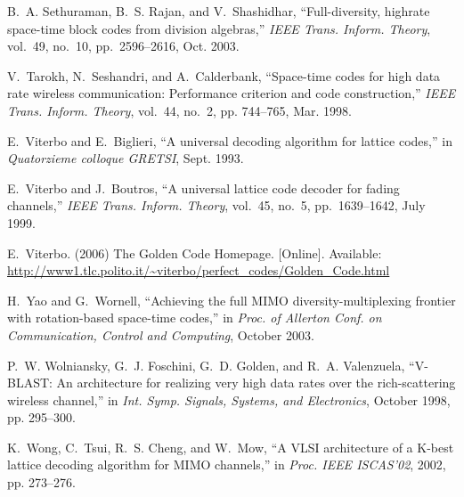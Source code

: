 \documentclass[12pt,onecolumn,draftclsnofoot]{IEEEtran}
\begin{document}
\begin{thebibliography}{10}
B.~A. Sethuraman, B.~S. Rajan, and V.~Shashidhar, ``Full-diversity,
highrate space-time block codes from division algebras,''
\emph{{IEEE} Trans. Inform. Theory}, vol.~49, no.~10,
pp.~2596--2616, Oct. 2003.

V.~Tarokh, N.~Seshandri, and A.~Calderbank, ``Space-time codes for
high data  rate wireless communication: Performance criterion and
code construction,''   \emph{{IEEE} Trans. Inform. Theory}, vol.~44,
no.~2, pp. 744--765, Mar. 1998.

E.~Viterbo and E.~Biglieri, ``A universal decoding algorithm for
lattice codes,'' in \emph{Quatorzieme colloque GRETSI}, Sept. 1993.

E.~Viterbo and J.~Boutros, ``A universal lattice code decoder for
fading channels,'' \emph{{IEEE} Trans. Inform. Theory}, vol.~45,
no.~5, pp.~1639--1642, July 1999.

E.~Viterbo. (2006) The Golden Code Homepage. [Online]. Available:\\
  \url{http://www1.tlc.polito.it/~viterbo/perfect_codes/Golden_Code.html}

H.~Yao and G.~Wornell, ``Achieving the full {MIMO}
diversity-multiplexing frontier with rotation-based space-time
codes,'' in \emph{Proc. of Allerton   Conf. on Communication,
Control and Computing}, October 2003.

P.~W. Wolniansky, G.~J. Foschini, G.~D. Golden, and R.~A.
Valenzuela,  ``{V-BLAST}: An architecture for realizing very high
data rates over the   rich-scattering wireless channel,'' in
\emph{Int. Symp. Signals, Systems, and Electronics}, October 1998,
pp. 295--300.

K.~Wong, C.~Tsui, R.~S. Cheng, and W.~Mow, ``A {VLSI} architecture
of a K-best lattice decoding algorithm for {MIMO} channels,'' in
\emph{Proc. IEEE ISCAS'02}, 2002, pp. 273--276.

\end{thebibliography}
\end{document}
